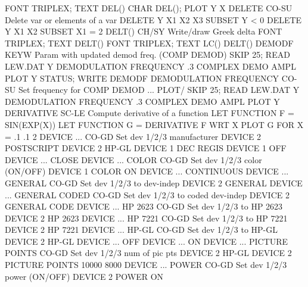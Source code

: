                                   FONT TRIPLEX; TEXT DEL()
                                  CHAR DEL(); PLOT Y X
DELETE                      CO-SU Delete var or elements of a var
                                  DELETE Y X1 X2 X3 SUBSET Y < 0
                                  DELETE Y X1 X2 SUBSET X1 = 2
DELT()                      CH/SY Write/draw Greek delta
                                  FONT TRIPLEX; TEXT DELT()
                                  FONT TRIPLEX; TEXT LC() DELT()
DEMODF                      KEYW  Param with updated demod freq. (COMP DEMOD)
                                  SKIP 25; READ LEW.DAT Y
                                  DEMODULATION FREQUENCY .3
                                  COMPLEX DEMO AMPL PLOT Y
                                  STATUS; WRITE DEMODF
DEMODULATION FREQUENCY      CO-SU Set frequency for COMP DEMOD ... PLOT/
                                  SKIP 25; READ LEW.DAT Y
                                  DEMODULATION FREQUENCY .3
                                  COMPLEX DEMO AMPL PLOT Y
DERIVATIVE                  SC-LE Compute derivative of a function
                                  LET FUNCTION F = SIN(EXP(X))
                                  LET FUNCTION G = DERIVATIVE F WRT X
                                  PLOT G FOR X = .1 .1 2
DEVICE ...                  CO-GD Set dev 1/2/3 manufacturer
                                  DEVICE 2 POSTSCRIPT
                                  DEVICE 2 HP-GL
                                  DEVICE 1 DEC REGIS
                                  DEVICE 1 OFF
DEVICE ... CLOSE
DEVICE ... COLOR            CO-GD Set dev 1/2/3 color (ON/OFF)
                                  DEVICE 1 COLOR ON
DEVICE ... CONTINUOUS
DEVICE ... GENERAL          CO-GD Set dev 1/2/3 to dev-indep
                                  DEVICE 2 GENERAL
DEVICE ... GENERAL CODED    CO-GD Set dev 1/2/3 to coded dev-indep
                                  DEVICE 2 GENERAL CODE
DEVICE ... HP 2623          CO-GD Set dev 1/2/3 to HP 2623
                                  DEVICE 2 HP 2623
DEVICE ... HP 7221          CO-GD Set dev 1/2/3 to HP 7221
                                  DEVICE 2 HP 7221
DEVICE ... HP-GL            CO-GD Set dev 1/2/3 to HP-GL
                                  DEVICE 2 HP-GL
DEVICE ... OFF
DEVICE ... ON
DEVICE ... PICTURE POINTS   CO-GD Set dev 1/2/3 num of pic pts
                                  DEVICE 2 HP-GL
                                  DEVICE 2 PICTURE POINTS 10000 8000
DEVICE ... POWER            CO-GD Set dev 1/2/3 power (ON/OFF)
                                  DEVICE 2 POWER ON
